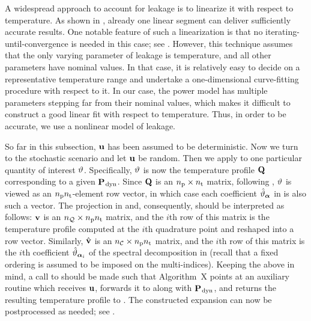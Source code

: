 \begin{remark}
A widespread approach to account for leakage is to linearize it with respect to temperature.
As shown in \cite{liu2007}, already one linear segment can deliver sufficiently accurate results.
One notable feature of such a linearization is that no iterating-until-convergence is needed in this case; see \cite{ukhov2012}.
However, this technique assumes that the only varying parameter of leakage is temperature, and all other parameters have nominal values.
In that case, it is relatively easy to decide on a representative temperature range and undertake a one-dimensional curve-fitting procedure with respect to it.
In our case, the power model has multiple parameters stepping far from their nominal values, which makes it difficult to construct a good linear fit with respect to temperature.
Thus, in order to be accurate, we use a nonlinear model of leakage.
\end{remark}

So far in this subsection, $\mathbf{u}$ has been assumed to be deterministic.
Now we turn to the stochastic scenario and let $\mathbf{u}$ be random.
Then we apply  to one particular quantity of interest $\vartheta$.
Specifically, $\vartheta$ is now the temperature profile $\mathbf{Q}$ corresponding to a given $\mathbf{P}_{\text{\kern0.1emdyn}}$.
Since $\mathbf{Q}$ is an ${n_\text{p}} \times {n_\text{t}}$ matrix, following , $\vartheta$ is viewed as an ${n_\text{p}} {n_\text{t}}$-element row vector, in which case each coefficient $\hat{\vartheta}_{\bm{\alpha}}$ in  is also such a vector.
The projection in  and, consequently,  should be interpreted as follows: $\mathbf{v}$ is an ${n_\mathcal{Q}} \times {n_\text{p}} {n_\text{t}}$ matrix, and the $i$th row of this matrix is the temperature profile computed at the $i$th quadrature point and reshaped into a row vector.
Similarly, $\hat{\mathbf{v}}$ is an ${n_\mathcal{C}} \times {n_\text{p}} {n_\text{t}}$ matrix, and the $i$th row of this matrix is the $i$th coefficient $\hat{\vartheta}_{\bm{\alpha}_i}$ of the spectral decomposition in  (recall that a fixed ordering is assumed to be imposed on the multi-indices).
Keeping the above in mind, a call to  should be made such that Algorithm~X points at an auxiliary routine which receives $\mathbf{u}$, forwards it to  along with $\mathbf{P}_{\text{\kern0.1emdyn}}$, and returns the resulting temperature profile to .
The constructed expansion can now be postprocessed as needed; see .


